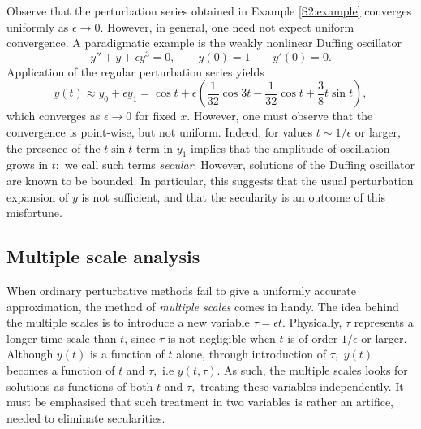 Observe that the perturbation series obtained in Example \ref{S2:example} converges uniformly as $\epsilon \to 0.$ However, in general, one need not expect uniform convergence. A paradigmatic example is the weakly nonlinear Duffing oscillator
\begin{equation}\label{Duffing}
 y'' + y + \epsilon y^3 = 0, \qquad y(0)=1 \qquad y'(0)=0.
\end{equation}
Application of the regular perturbation series yields
\begin{equation}\label{S2:sol}
y(t) \approx y_0 + \epsilon y_1 = \cos t + \epsilon\left(\frac{1}{32} \cos 3t -\frac{1}{32} \cos t + \frac{3}{8} t \sin t\right ),
\end{equation}
which converges as $\epsilon \to 0$ for fixed $x.$ However, one must observe that the convergence is point-wise, but not uniform. Indeed, for values $t \sim 1/\epsilon$ or larger, the presence of the $t \sin t$ term in $y_1$ implies that the amplitude of oscillation grows in $t;$ we call such terms \textit{secular}. However, solutions of the Duffing oscillator are known to be bounded. In particular, this suggests that the usual perturbation expansion of $y$ is not sufficient, and that the secularity is an outcome of this misfortune.

\subsection*{Multiple scale analysis}
When ordinary perturbative methods fail to give a uniformly accurate approximation, the method of \textit{multiple scales} comes in handy. The idea behind the multiple scales is to introduce a new variable $\tau = \epsilon t.$ Physically, $\tau$ represents a longer time scale than $t$, since $\tau$ is not negligible when $t$ is of order $1/\epsilon$ or larger. Although $y(t)$ is a function of $t$ alone, through introduction of $\tau,$ $y(t)$ becomes a function of $t$ and $\tau,$ i.e $y(t, \tau).$ As such, the multiple scales looks for solutions as functions of both $t$ and $\tau,$ treating these variables independently. It must be emphasised that such treatment in two variables is rather an artifice, needed to eliminate secularities.

